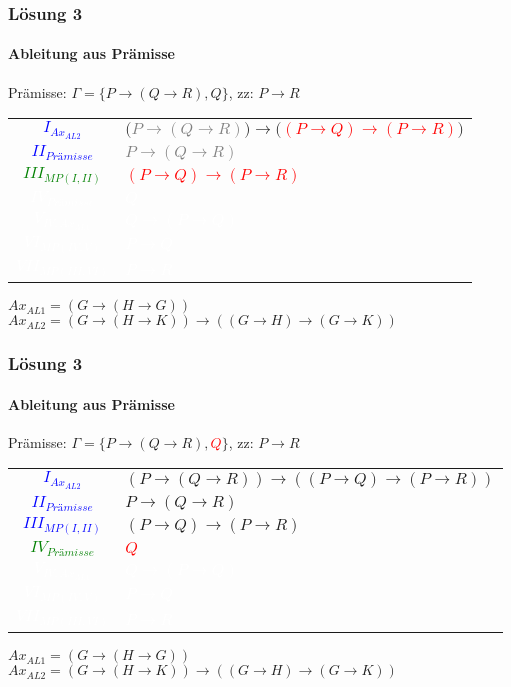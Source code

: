 \documentclass{beamer}
\begin{document}
	\begin{frame}
		\frametitle{Lösung 3}
		\framesubtitle{Ableitung aus Prämisse}
		Prämisse: $\Gamma =\{P\rightarrow(Q\rightarrow R), Q\}$, zz: $P\rightarrow R$\\
		\begin{tabular}{cl}
			\textcolor{blue}{$I_{Ax_{AL2}}$} & $($\textcolor{gray}{$P\rightarrow(Q\rightarrow R)$}$)\rightarrow($\textcolor{red}{$(P\rightarrow Q)\rightarrow(P\rightarrow R)$}$)$\\
			\textcolor{blue}{$II_{Prämisse}$} & \textcolor{gray}{$P\rightarrow(Q\rightarrow R)$}\\
			\textcolor{green}{$III_{MP(I, II)}$} & \textcolor{red}{$(P\rightarrow Q)\rightarrow(P\rightarrow R)$}\\
			\textcolor{white}{$IV_{Prämisse}$} & \textcolor{white}{$Q$}\\
			\textcolor{white}{$V_{IV, Ax_{AL1}}$} & \textcolor{white}{$Q\rightarrow(P\rightarrow Q)$}\\
			\textcolor{white}{$VI_{MP(IV, V)}$} & \textcolor{white}{$P\rightarrow Q$}\\
			\textcolor{white}{$VII_{MP(III, VI)}$} & \textcolor{white}{$P\rightarrow R$}\\
		\end{tabular}
		$Ax_{AL1} = (G\rightarrow(H\rightarrow G))$\\
		$Ax_{AL2} = (G\rightarrow(H\rightarrow K))\rightarrow((G\rightarrow H)\rightarrow(G\rightarrow K))$\\
	\end{frame}
	\begin{frame}
		\frametitle{Lösung 3}
		\framesubtitle{Ableitung aus Prämisse}
		Prämisse: $\Gamma =\{P\rightarrow(Q\rightarrow R), $\textcolor{red}{$Q$}$\}$, zz: $P\rightarrow R$\\
		\begin{tabular}{cl}
			\textcolor{blue}{$I_{Ax_{AL2}}$} & $(P\rightarrow(Q\rightarrow R))\rightarrow((P\rightarrow Q)\rightarrow(P\rightarrow R))$\\
			\textcolor{blue}{$II_{Prämisse}$} & $P\rightarrow(Q\rightarrow R)$\\
			\textcolor{blue}{$III_{MP(I, II)}$} & $(P\rightarrow Q)\rightarrow(P\rightarrow R)$\\
			\textcolor{green}{$IV_{Prämisse}$} & \textcolor{red}{$Q$}\\
			\textcolor{white}{$V_{IV, Ax_{AL1}}$} & \textcolor{white}{$Q\rightarrow(P\rightarrow Q)$}\\
			\textcolor{white}{$VI_{MP(IV, V)}$} & \textcolor{white}{$P\rightarrow Q$}\\
			\textcolor{white}{$VII_{MP(III, VI)}$} & \textcolor{white}{$P\rightarrow R$}\\
		\end{tabular}
		$Ax_{AL1} = (G\rightarrow(H\rightarrow G))$\\
		$Ax_{AL2} = (G\rightarrow(H\rightarrow K))\rightarrow((G\rightarrow H)\rightarrow(G\rightarrow K))$\\
	\end{frame}
\end{document}
